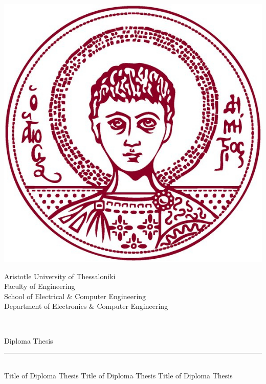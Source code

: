 \begin{titlepage}

  \begin{minipage}{0.3\textwidth}
    \begin{flushleft}
      \includegraphics[scale=0.25]{assets/images/auth_logo_color.jpg}
    \end{flushleft}
  \end{minipage}
  \begin{minipage}{0.9\textwidth}
    \begin{center}
      \large Aristotle University of Thessaloniki\\ [0.1cm]
      Faculty of Engineering\\ [0.3cm]
      \normalsize{School of Electrical $\&$ Computer Engineering}\\ [0.1cm]
      \normalsize{Department of Electronics $\&$ Computer Engineering} \\[5cm]
    \end{center}
  \end{minipage} \\[1.7cm]


  \begin{center}
    \Large Diploma Thesis \\[0.8cm]

    \rule{350pt}{4pt} \\[0.4cm]
    {\fontsize{20.26pt}{1em}\selectfont Title of Diploma Thesis Title of Diploma Thesis Title of Diploma Thesis}


\end{center}
\end{titlepage}
